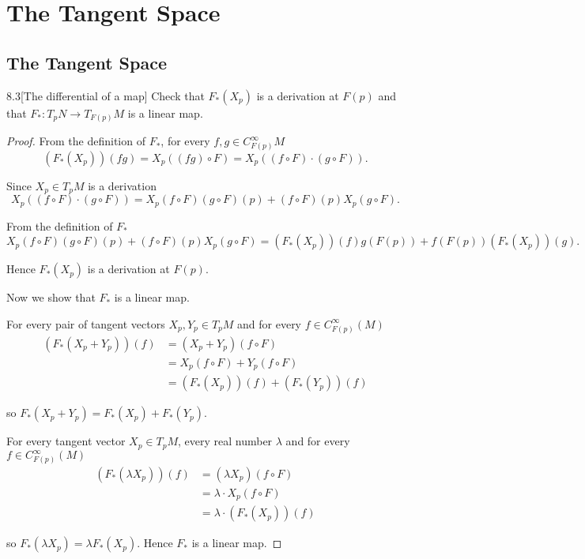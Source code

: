 \chapter{The Tangent Space}

\section{The Tangent Space}

\begin{exercise}{8.3}[The differential of a map]
    Check that \( F_{\ast}(X_{p}) \) is a derivation at \( F(p) \) and that \( F_{\ast}: T_{p}N \to T_{F(p)}M \) is a linear map.
\end{exercise}

\begin{proof}
    From the definition of \( F_{\ast} \), for every \( f, g \in C^{\infty}_{F(p)}M \)
    \[
        (F_{\ast}(X_{p}))(fg) = X_{p}((fg) \circ F) = X_{p}((f \circ F) \cdot (g \circ F)).
    \]

    Since \( X_{p} \in T_{p}M \) is a derivation
    \[
        X_{p}((f \circ F) \cdot (g \circ F)) = X_{p}(f \circ F) (g\circ F)(p) + (f\circ F)(p) X_{p}(g\circ F).
    \]

    From the definition of \( F_{\ast} \)
    \[
        X_{p}(f \circ F) (g\circ F)(p) + (f\circ F)(p) X_{p}(g\circ F) = (F_{\ast}(X_{p}))(f) g(F(p)) + f(F(p)) (F_{\ast}(X_{p}))(g).
    \]

    Hence \( F_{\ast}(X_{p}) \) is a derivation at \( F(p) \).

    Now we show that \( F_{\ast} \) is a linear map.

    For every pair of tangent vectors \( X_{p}, Y_{p} \in T_{p}M \) and for every \( f \in C^{\infty}_{F(p)}(M) \)
    \begingroup
    \allowdisplaybreaks%
    \begin{align*}
        (F_{\ast}(X_{p} + Y_{p}))(f) & = (X_{p} + Y_{p})(f \circ F)                  \\
                                     & = X_{p}(f\circ F) + Y_{p}(f\circ F)           \\
                                     & = (F_{\ast}(X_{p}))(f) + (F_{\ast}(Y_{p}))(f)
    \end{align*}
    \endgroup

    so \( F_{\ast}(X_{p} + Y_{p}) = F_{\ast}(X_{p}) + F_{\ast}(Y_{p}) \).

    For every tangent vector \( X_{p} \in T_{p}M \), every real number \( \lambda \) and for every \( f \in C^{\infty}_{F(p)}(M) \)
    \begingroup
    \allowdisplaybreaks%
    \begin{align*}
        (F_{\ast}(\lambda X_{p}))(f) & = (\lambda X_{p})(f \circ F)         \\
                                     & = \lambda \cdot X_{p}(f \circ F)     \\
                                     & = \lambda \cdot (F_{\ast}(X_{p}))(f)
    \end{align*}
    \endgroup

    so \( F_{\ast}(\lambda X_{p}) = \lambda F_{\ast}(X_{p}) \). Hence \( F_{\ast} \) is a linear map.
\end{proof}

